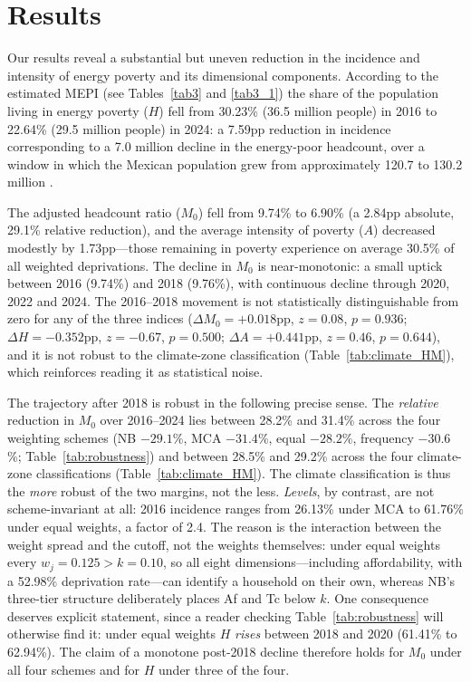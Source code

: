 \documentclass[11pt, a4paper]{article}
\begin{document}
\section{Results}\label{results}

Our results reveal a substantial but uneven reduction in the incidence and intensity of energy poverty and its dimensional components. According to the estimated MEPI (see Tables~\ref{tab3} and \ref{tab3_1}) the share of the population living in energy poverty ($H$) fell from 30.23\% (36.5 million people) in 2016 to 22.64\% (29.5 million people) in 2024: a 7.59pp reduction in incidence corresponding to a 7.0 million decline in the energy-poor headcount, over a window in which the Mexican population grew from approximately 120.7 to 130.2 million \parencite{enigh2016, enigh2024}. 

The adjusted headcount ratio ($M_0$) fell from 9.74\% to 6.90\% (a 2.84pp absolute, 29.1\% relative reduction), and the average intensity of poverty ($A$) decreased modestly by 1.73pp---those remaining in poverty experience on average 30.5\% of all weighted deprivations. The decline in $M_0$ is near-monotonic: a small uptick between 2016 (9.74\%) and 2018 (9.76\%), with continuous decline through 2020, 2022 and 2024. The 2016--2018 movement is not statistically distinguishable from zero for any of the three indices ($\Delta M_0 = +0.018$pp, $z=0.08$, $p=0.936$; $\Delta H = -0.352$pp, $z=-0.67$, $p=0.500$; $\Delta A = +0.441$pp, $z=0.46$, $p=0.644$), and it is not robust to the climate-zone classification (Table~\ref{tab:climate_HM}), which reinforces reading it as statistical noise.

The trajectory after 2018 is robust in the following precise sense. The \emph{relative} reduction in $M_0$ over 2016--2024 lies between 28.2\% and 31.4\% across the four weighting schemes (NB $-29.1$\%, MCA $-31.4$\%, equal $-28.2$\%, frequency $-30.6$\%; Table~\ref{tab:robustness}) and between 28.5\% and 29.2\% across the four climate-zone classifications (Table~\ref{tab:climate_HM}). The climate classification is thus the \emph{more} robust of the two margins, not the less. \emph{Levels}, by contrast, are not scheme-invariant at all: 2016 incidence ranges from 26.13\% under MCA to 61.76\% under equal weights, a factor of 2.4. The reason is the interaction between the weight spread and the cutoff, not the weights themselves: under equal weights every $w_j = 0.125 > k = 0.10$, so all eight dimensions---including affordability, with a 52.98\% deprivation rate---can identify a household on their own, whereas NB's three-tier structure deliberately places Af and Tc below $k$. One consequence deserves explicit statement, since a reader checking Table~\ref{tab:robustness} will otherwise find it: under equal weights $H$ \emph{rises} between 2018 and 2020 (61.41\% to 62.94\%). The claim of a monotone post-2018 decline therefore holds for $M_0$ under all four schemes and for $H$ under three of the four.
\end{document}
